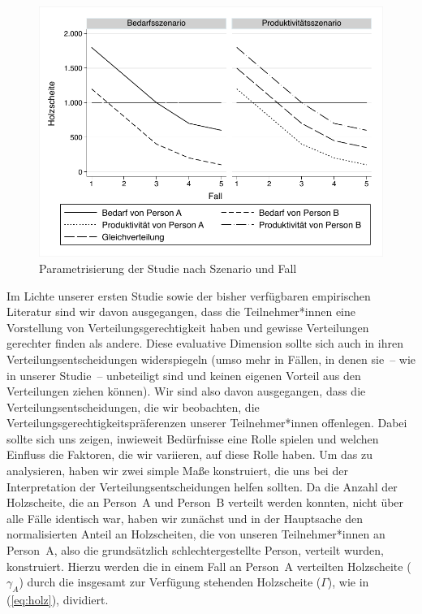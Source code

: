 \documentclass[justified,nobib,symmetric,twoside]{tufte-handout}
\begin{document}
\begin{figure}[t]\label{fig:abbildung_5}
   \center
   \includegraphics[width=0.99\linewidth]{figure_5.pdf}
   \caption{Parametrisierung der Studie nach Szenario und Fall}
\end{figure}

Im Lichte unserer ersten Studie sowie der bisher verfügbaren empirischen Literatur sind wir davon ausgegangen, dass die Teilnehmer*innen eine Vorstellung von Verteilungsgerechtigkeit haben und gewisse Verteilungen gerechter finden als andere.
Diese evaluative Dimension sollte sich auch in ihren Verteilungsentscheidungen widerspiegeln (umso mehr in Fällen, in denen sie~-- wie in unserer Studie~-- unbeteiligt sind und keinen eigenen Vorteil aus den Verteilungen ziehen können).
Wir sind also davon ausgegangen, dass die Verteilungsentscheidungen, die wir beobachten, die Verteilungsgerechtigkeitspräferenzen unserer Teilnehmer*innen offenlegen.
Dabei sollte sich uns zeigen, inwieweit Bedürfnisse eine Rolle spielen und welchen Einfluss die Faktoren, die wir variieren, auf diese Rolle haben.
Um das zu analysieren, haben wir zwei simple Maße konstruiert, die uns bei der Interpretation der Verteilungsentscheidungen helfen sollten.
Da die Anzahl der Holzscheite, die an Person~A und Person~B verteilt werden konnten, nicht über alle Fälle identisch war, haben wir zunächst und in der Hauptsache den normalisierten Anteil an Holzscheiten, die von unseren Teilnehmer*innen an Person~A, also die grundsätzlich schlechtergestellte Person, verteilt wurden, konstruiert.
Hierzu werden die in einem Fall an Person~A verteilten Holzscheite ($\gamma_{A}$) durch die insgesamt zur Verfügung stehenden Holzscheite ($\Gamma$), wie in (\ref{eq:holz}), dividiert.
\end{document}
